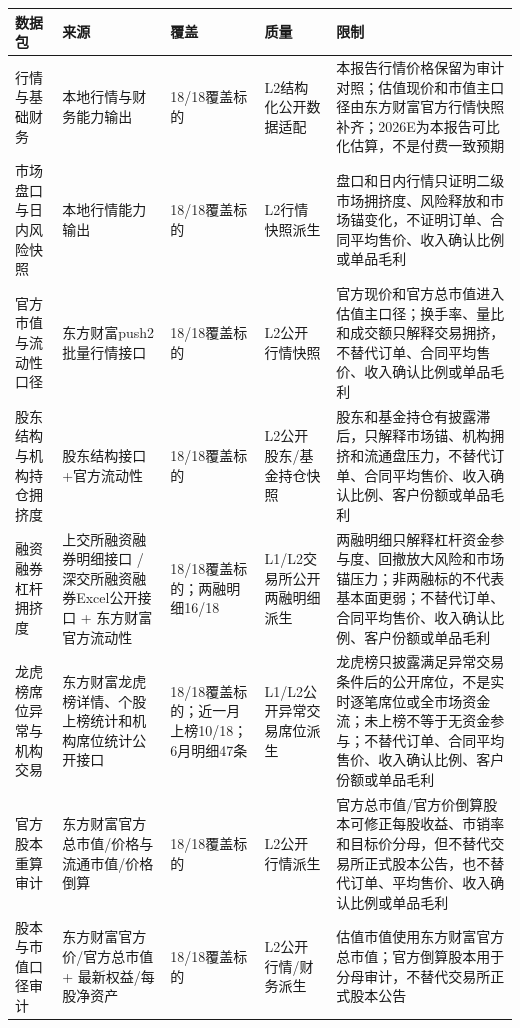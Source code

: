 \begin{exhibitbox}[结构化数据源健康（1）]
\scriptsize
\begin{tabularx}{\exhibitboxwidth}{L{2.1cm} L{2.4cm} L{2.4cm} L{1.5cm} X}
\toprule
\textbf{数据包} & \textbf{来源} & \textbf{覆盖} & \textbf{质量} & \textbf{限制} \\
\midrule
行情与基础财务 & 本地行情与财务能力输出 & 18/18覆盖标的 & L2结构化公开数据适配 & 本报告行情价格保留为审计对照；估值现价和市值主口径由东方财富官方行情快照补齐；2026E为本报告可比化估算，不是付费一致预期 \\
市场盘口与日内风险快照 & 本地行情能力输出 & 18/18覆盖标的 & L2行情快照派生 & 盘口和日内行情只证明二级市场拥挤度、风险释放和市场锚变化，不证明订单、合同平均售价、收入确认比例或单品毛利 \\
官方市值与流动性口径 & 东方财富push2批量行情接口 & 18/18覆盖标的 & L2公开行情快照 & 官方现价和官方总市值进入估值主口径；换手率、量比和成交额只解释交易拥挤，不替代订单、合同平均售价、收入确认比例或单品毛利 \\
股东结构与机构持仓拥挤度 & 股东结构接口+官方流动性 & 18/18覆盖标的 & L2公开股东/基金持仓快照 & 股东和基金持仓有披露滞后，只解释市场锚、机构拥挤和流通盘压力，不替代订单、合同平均售价、收入确认比例、客户份额或单品毛利 \\
融资融券杠杆拥挤度 & 上交所融资融券明细接口 / 深交所融资融券Excel公开接口 + 东方财富官方流动性 & 18/18覆盖标的；两融明细16/18 & L1/L2交易所公开两融明细派生 & 两融明细只解释杠杆资金参与度、回撤放大风险和市场锚压力；非两融标的不代表基本面更弱；不替代订单、合同平均售价、收入确认比例、客户份额或单品毛利 \\
龙虎榜席位异常与机构交易 & 东方财富龙虎榜详情、个股上榜统计和机构席位统计公开接口 & 18/18覆盖标的；近一月上榜10/18；6月明细47条 & L1/L2公开异常交易席位派生 & 龙虎榜只披露满足异常交易条件后的公开席位，不是实时逐笔席位或全市场资金流；未上榜不等于无资金参与；不替代订单、合同平均售价、收入确认比例、客户份额或单品毛利 \\
官方股本重算审计 & 东方财富官方总市值/价格与流通市值/价格倒算 & 18/18覆盖标的 & L2公开行情派生 & 官方总市值/官方价倒算股本可修正每股收益、市销率和目标价分母，但不替代交易所正式股本公告，也不替代订单、平均售价、收入确认比例或单品毛利 \\
股本与市值口径审计 & 东方财富官方价/官方总市值 + 最新权益/每股净资产 & 18/18覆盖标的 & L2公开行情/财务派生 & 估值市值使用东方财富官方总市值；官方倒算股本用于分母审计，不替代交易所正式股本公告 \\
\bottomrule
\end{tabularx}
\end{exhibitbox}

